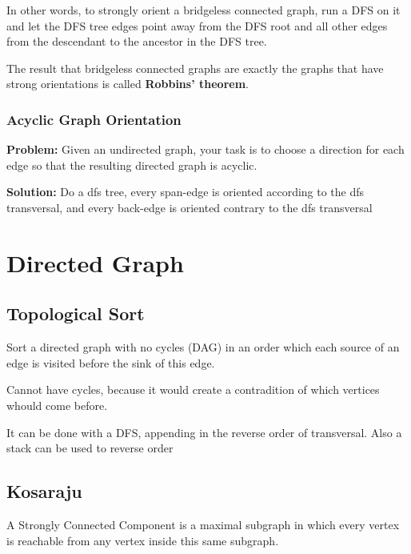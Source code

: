 	In other words, to strongly orient a bridgeless connected graph, 
	run a DFS on it and let the DFS tree edges point away from the DFS root and all other edges 
	from the descendant to the ancestor in the DFS tree.


	The result that bridgeless connected graphs are exactly the graphs that have strong orientations is called \textbf{Robbins' theorem}.

		\subsubsection{Acyclic Graph Orientation}

			\textbf{Problem:} Given an undirected graph, your task is to choose a direction for each edge so that the resulting directed graph is acyclic.

			\textbf{Solution:} Do a dfs tree, every span-edge is oriented according to the dfs transversal,
			and every back-edge is oriented contrary to the dfs transversal


\section{Directed Graph}

	\subsection{Topological Sort}

	Sort a directed graph with no cycles (DAG) in an order which each source of an edge is visited before the sink of this edge.

	Cannot have cycles, because it would create a contradition of which vertices whould come before.

	It can be done with a DFS, appending in the reverse order of transversal. Also a stack can be used to reverse order	


    \vspace{5pts}
	
	\subsection{Kosaraju}

	A Strongly Connected Component is a maximal subgraph in which every vertex is reachable
	from any vertex inside this same subgraph.


